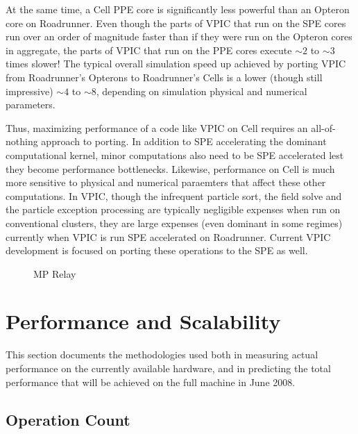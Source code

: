 \documentclass[letter,10pt]{article}
\begin{document}
At the same time, a Cell PPE core is significantly less powerful than
an Opteron core on Roadrunner.  Even though the parts of VPIC that run
on the SPE cores run over an order of magnitude faster than if they
were run on the Opteron cores in aggregate, the parts of VPIC that run
on the PPE cores execute $\sim 2$ to $\sim 3$ times slower!  The
typical overall simulation speed up achieved by porting VPIC from
Roadrunner's Opterons to Roadrunner's Cells is a lower (though still
impressive) $\sim 4$ to $\sim 8$, depending on simulation physical and
numerical parameters.


Thus, maximizing performance of a code like VPIC on Cell requires an
all-of-nothing approach to porting.  In addition to SPE accelerating
the dominant computational kernel, minor computations also need to be
SPE accelerated lest they become performance bottlenecks.  Likewise,
performance on Cell is much more sensitive to physical and numerical
paraemters that affect these other computations.  In VPIC, though the
infrequent particle sort, the field solve and the particle exception
processing are typically negligible expenses when run on conventional
clusters, they are large expenses (even dominant in some regimes)
currently when VPIC is run SPE accelerated on Roadrunner.  Current
VPIC development is focused on porting these operations to the SPE as
well.

\begin{figure}
    \begin{center}
    \scalebox{0.25}{}
    \caption{MP Relay}
    \label{fig:relay}
    \end{center}
\end{figure}

\section*{Performance and Scalability} \label{sec:performance}

This section documents the methodologies used both in measuring actual performance on the currently available hardware, and in predicting the total performance that will be achieved on the full machine in June 2008.

\subsection{Operation Count}
\end{document}
